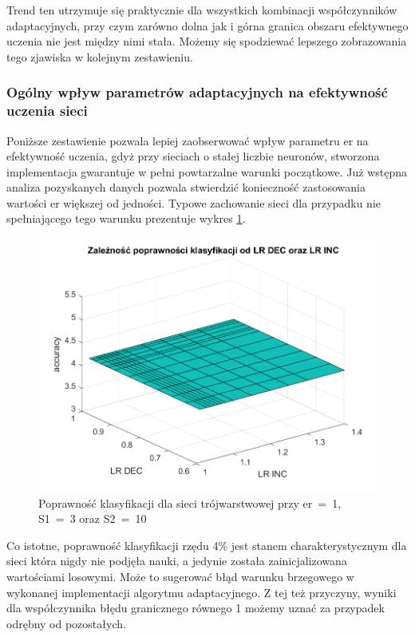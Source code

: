 \documentclass[12pt,twoside]{article}
\begin{document}
Trend ten utrzymuje się praktycznie dla wszystkich kombinacji współczynników adaptacyjnych, przy czym zarówno dolna jak i górna granica obszaru efektywnego uczenia nie jest między nimi stała.
Możemy się spodziewać lepszego zobrazowania tego zjawiska w kolejnym zestawieniu.

\clearpage
\subsubsection{Ogólny wpływ parametrów adaptacyjnych na efektywność uczenia sieci}
Poniższe zestawienie pozwala lepiej zaobserwować wpływ parametru er na efektywność uczenia, gdyż przy sieciach o stałej liczbie neuronów, stworzona implementacja gwarantuje w pełni powtarzalne warunki początkowe.
Już wstępna analiza pozyskanych danych pozwala stwierdzić konieczność zastosowania wartości er większej od jedności.
Typowe zachowanie sieci dla przypadku nie spełniającego tego warunku prezentuje wykres \ref{Fig:ErIncDec1}.

\begin{figure}[ht]
	\centering
	\includegraphics[width=16cm]{figures/ErIncDec_1.png}
	\caption{Poprawność klasyfikacji dla sieci trójwarstwowej przy er~=~1, S1~=~3 oraz S2~=~10}
	\label{Fig:ErIncDec1}
\end{figure}

Co istotne, poprawność klasyfikacji rzędu 4\% jest stanem charakterystycznym dla sieci która nigdy nie podjęła nauki, a jedynie została zainicjalizowana wartościami losowymi.
Może to sugerować błąd warunku brzegowego w wykonanej implementacji algorytmu adaptacyjnego.
Z tej też przyczyny, wyniki dla współczynnika błędu granicznego równego 1 możemy uznać za przypadek odrębny od pozostałych.
\end{document}

